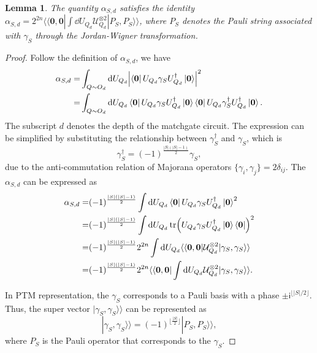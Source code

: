 \documentclass[showpacs,twocolumn,aps,prx,long bibliography,superscriptaddress,notitlepage]{revtex4-1}
\newtheorem{lemma}{Lemma}
\newcommand{\ii}{\mathsf{i}}
\newcommand{\supket}[1]{|#1 \rangle\rangle}
\newcommand{\supbra}[1]{\langle\langle #1 |}
\newcommand{\floor}[1]{\lfloor #1 \rfloor}
\begin{document}
\begin{lemma}
\label{lemma: The net phase of alpha is 1}
The quantity $\alpha_{S,d}$ satisfies the identity $\alpha_{S,d} = 2^{2n} \supbra{\bm{0}, \bm{0}} \int \dd U_{Q_d} \mathcal{U}_{Q_d}^{\otimes 2} \supket{P_S, P_S}$, where $P_S$ denotes the Pauli string associated with $\gamma_S$ through the Jordan-Wigner transformation.
\end{lemma}
\begin{proof}

Follow the definition of $\alpha_{S,d}$, we have
\begin{align}
    \alpha_{S,d} =& \int_{Q\sim O_d } \dd U_{Q_d} \abs{\bra{\bm 0} U_{Q_d} \gamma_S U_{Q_d}^\dagger \ket{\bm 0}}^2 \\
    =& \int_{Q\sim O_d } \dd U_{Q_d} \bra{\bm 0} U_{Q_d} \gamma_S U_{Q_d}^\dagger \ket{\bm 0}\bra{\bm 0} U_{Q_d} \gamma_S^\dagger U_{Q_d}^\dagger \ket{\bm 0}.
\end{align}
The subscript $d$ denotes the depth of the matchgate circuit. 
The expression can be simplified by substituting the relationship between $\gamma_S^\dagger$ and $\gamma_S$, which is 
\begin{equation}
    \gamma_S^\dagger = (-1)^{\frac{|S|(|S|-1)}{2}}\gamma_S,
\end{equation}
due to the anti-commutation relation of Majorana operators $\{\gamma_i, \gamma_j\} = 2\delta_{ij}$. 
The $\alpha_{S, d}$ can be expressed as  
\begin{align}
    \alpha_{S,d} =& (-1)^{\frac{|S|(|S|-1)}{2}}\int \dd U_{Q_d} 
    \bra{\bm 0}U_{Q_d} \gamma_SU_{Q_d}^\dagger\ket{\bm 0}^2\\
    =& (-1)^{\frac{|S|(|S|-1)}{2}} \int \dd U_{Q_d} 
    \tr(U_{Q_d} \gamma_SU_{Q_d}^\dagger\ket{\bm 0} \bra{\bm 0} )^2\\
    =& (-1)^{\frac{|S|(|S|-1)}{2}} 2^{2n} \int \dd U_{Q_d} 
    \supbra{\bm 0,\bm 0} \mathcal{U}_{Q_d}^{\otimes 2} \supket{\gamma_S,\gamma_S} \\
    =& (-1)^{\frac{|S|(|S|-1)}{2}} 2^{2n}  \supbra{\bm 0,\bm 0}  \int\dd U_{Q_d} \mathcal{U}_{Q_d}^{\otimes 2} \supket{\gamma_S,\gamma_S}.
    \label{appendix eq: alpha to net}
\end{align}

In PTM representation, the $\gamma_S$ corresponds to a Pauli basis with a phase $\pm \ii^{\floor{|S|/2}}$. Thus, the super vector $\supket{\gamma_S, \gamma_S}$ can be represented as 
\begin{equation}
    \supket{\gamma_S, \gamma_S} = (-1)^{\floor{\frac{|S|}{2}}} \supket{P_S, P_S},
    \label{appendix eq: gamma to P}
\end{equation}
 where $P_S$ is the Pauli operator that corresponds to the $\gamma_S$.


\end{proof}
\end{document}
